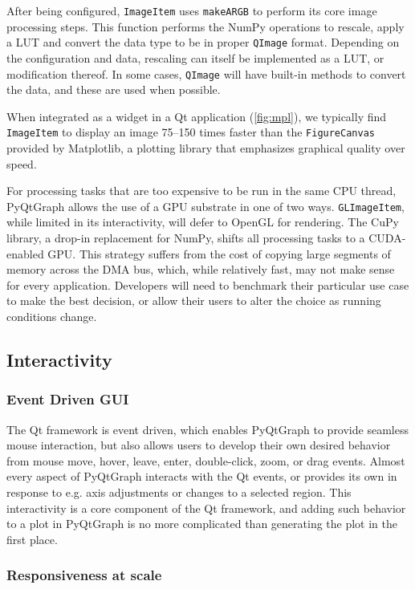 \documentclass[journal]{vgtc}                %
\begin{document}
\color{black}
After being configured, \texttt{ImageItem} uses \texttt{makeARGB} to perform its core image processing steps. This function performs the NumPy operations to rescale, apply a LUT and convert the data type to be in proper \texttt{QImage} format. Depending on the configuration and data, rescaling can itself be implemented as a LUT, or modification thereof. In some cases, \texttt{QImage} will have built-in methods to convert the data, and these are used when possible.

\color{DarkOrchid}
When integrated as a widget in a Qt application (\autoref{fig:mpl}), we typically find \texttt{ImageItem} to display an image 75--150 times faster than the \texttt{FigureCanvas} provided by Matplotlib, a plotting library that emphasizes graphical quality over speed.

\color{black}

For processing tasks that are too expensive to be run in the same CPU thread, PyQtGraph allows the use of a GPU substrate in one of two ways. \texttt{GLImageItem}, while limited in its interactivity, will defer to OpenGL for rendering. The CuPy library, a drop-in replacement for NumPy, shifts all processing tasks to a CUDA-enabled GPU. This strategy suffers from the cost of copying large segments of memory across the DMA bus, which, while relatively fast, may not make sense for every application. Developers will need to benchmark their particular use case to make the best decision, or allow their users to alter the choice as running conditions change.


\subsection{Interactivity}
\subsubsection{Event Driven GUI}
The Qt framework is event driven, which enables PyQtGraph to provide seamless mouse interaction, but also allows users to develop their own desired behavior from mouse move, hover, leave, enter, double-click, zoom, or drag events. Almost every aspect of PyQtGraph interacts with the Qt events, or provides its own in response to e.g. axis adjustments or changes to a selected region. This interactivity is a core component of the Qt framework, and adding such behavior to a plot in PyQtGraph is no more complicated than generating the plot in the first place.

\subsubsection{Responsiveness at scale}
\end{document}
